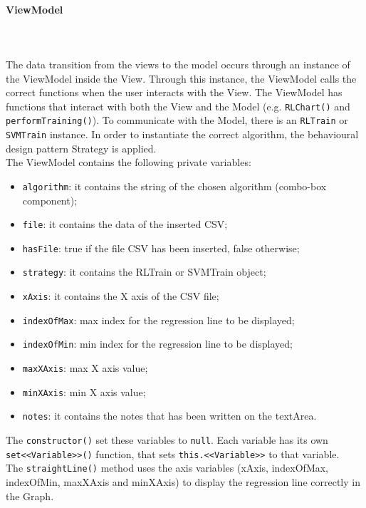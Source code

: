 \paragraph{ViewModel}\mbox{} \\ \mbox{} \\
The data transition from the views to the model occurs through an instance of the ViewModel inside the View. Through this instance, the ViewModel calls the correct functions when the user interacts with the View.
The ViewModel has functions that interact with both the View and the Model (e.g. \texttt{RLChart()} and \texttt{performTraining()}).
To communicate with the Model, there is an \texttt{RLTrain} or \texttt{SVMTrain} instance. In order to instantiate the correct algorithm, the behavioural design pattern Strategy is applied. \\
The ViewModel contains the following private variables: \begin{itemize}
\item \texttt{algorithm}: it contains the string of the chosen algorithm (combo-box component);
\item \texttt{file}: it contains the data of the inserted CSV;
\item \texttt{hasFile}: true if the file CSV has been inserted, false otherwise;
\item \texttt{strategy}: it contains the RLTrain or SVMTrain object;
\item \texttt{xAxis}: it contains the X axis of the CSV file;
\item \texttt{indexOfMax}: max index for the regression line to be displayed;
\item \texttt{indexOfMin}: min index for the regression line to be displayed;
\item \texttt{maxXAxis}: max X axis value;
\item \texttt{minXAxis}: min X axis value;
\item \texttt{notes}: it contains the notes that has been written on the textArea.
\end{itemize}
The \texttt{constructor()} set these variables to \texttt{null}.
Each variable has its own \texttt{set<<Variable>>()} function, that sets \texttt{this.<<Variable>>} to that variable. \\
The \texttt{straightLine()} method uses the axis variables (xAxis, indexOfMax, indexOfMin, maxXAxis and minXAxis) to display the regression line correctly in the Graph.

